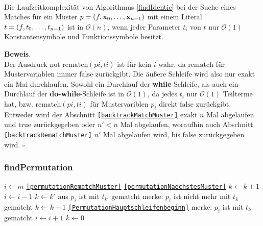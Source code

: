 \begin{lemma}\label{lemKomplexitaetFindPermutation}~\\
Die Laufzeitkomplexität von Algorithmus \ref{findIdentic} bei der Suche eines Matches für ein Muster $p = (f, {\mathbf x}_{0}, \dots, {\mathbf x}_{n-1})$ mit einem Literal $t = (f, {t}_{0}, \dots, {t}_{n-1})$ ist in $\mathcal O(n)$, wenn jeder Parameter $t_i$ von $t$ nur $\mathcal O(1)$ Konstantensymbole und Funktionssymbole besitzt.
\end{lemma}

\textbf{Beweis}.\\
Der Ausdruck $\mathrm{not}$ $\mathrm{rematch}(pi , ti)$ ist für kein $i$ wahr, da $\mathrm{rematch}$ für Mustervariablen immer $\mathrm{false}$ zurückgibt. Die äußere Schleife wird also nur exakt ein Mal durchlaufen. Sowohl ein Durchlauf der \textbf{while}-Schleife, als auch ein Durchlauf der \textbf{do-while}-Schleife ist in $\mathcal O(1)$, da jedes $t_i$ nur $\mathcal O(1)$ Teilterme hat, bzw. $\mathrm{rematch}(pi , ti)$ für Mustervariblen $p_i$ direkt $\mathrm{false}$ zurückgibt. Entweder wird der Abschnitt \texttt{\ref{backtrackMatchMuster}} exakt $n$ Mal abgelaufen und $\mathrm{true}$ zurückgegeben oder $n' < n$ Mal abgelaufen, woraufhin auch Abschnitt \texttt{\ref{backtrackRematchMuster}} $n'$ Mal abgelaufen wird, bis $\mathrm{false}$ zurückgegeben wird. 
\hfill $\square$\\



\subsubsection {findPermutation}
\begin{algorithm}
\DontPrintSemicolon
\caption{$\mathrm{findPermutation} \colon M \times T \times \mathit{Bool} \rightarrow \mathit{Bool}$}\label{findPermutation}
\;
 {
	$i \leftarrow m$\;
	\Goto \texttt{\ref{permutationRematchMuster}}\;
}
  {
 }
 \label{PermutationHauptschleifenbeginn}
  {
	 {
		 {
			 {
				\Goto \texttt{\ref{permutationNaechstesMuster}}\;
			}
		}
		$k \leftarrow k + 1$\;
	}
	\label{permutationRematchMuster}
	 {
	}
	$i \leftarrow i - 1$\;
	{$k \leftarrow k'$ aus \glqq $p_{i}$ ist mit $t_{k'}$ gematcht\grqq{}}\;
	 {
		merke: $p_{i}$ ist nicht mehr mit $t_{k}$ gematcht\;
		$k \leftarrow k + 1$\;
		\Goto \texttt{\ref{PermutationHauptschleifenbeginn}}\;
	} 
	\label{permutationNaechstesMuster}
	merke: $p_i$ ist mit $t_k$ gematcht\;
	$i \leftarrow i + 1$\;
	$k \leftarrow 0$\;    
 }
\end{algorithm}

